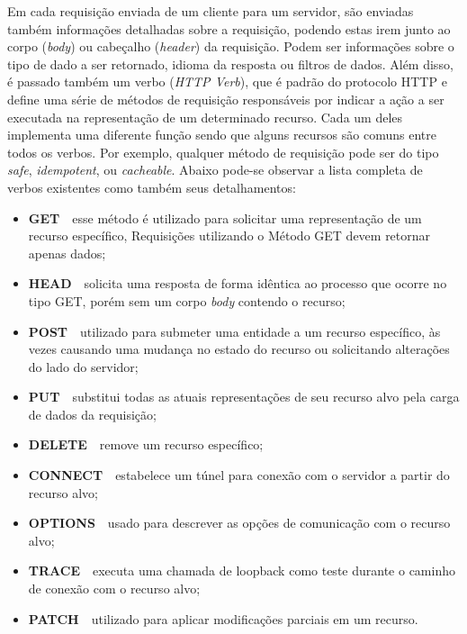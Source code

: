 Em cada requisição enviada de um cliente para um servidor, são enviadas também informações detalhadas sobre a requisição, podendo estas irem junto ao corpo (\textit{body}) ou cabeçalho (\textit{header}) da requisição. Podem ser informações sobre o tipo de dado a ser retornado, idioma da resposta ou filtros de dados. Além disso, é passado também um verbo (\textit{HTTP Verb}), que é padrão do protocolo HTTP e define uma série de métodos de requisição responsáveis por indicar a ação a ser executada na representação de um determinado recurso. Cada um deles implementa uma diferente função sendo que alguns recursos são comuns entre todos os verbos. Por exemplo, qualquer método de requisição pode ser do tipo  \textit{safe}, \textit{idempotent}, ou \textit{cacheable}. Abaixo pode-se observar a lista completa de verbos existentes como também seus detalhamentos:
\begin{itemize}
    \item \textbf{GET}~\textemdash~esse método é utilizado para solicitar uma representação de um recurso específico, Requisições utilizando o Método GET devem retornar apenas dados;
    \item \textbf{HEAD}~\textemdash~solicita uma resposta de forma idêntica ao processo que ocorre no tipo GET, porém sem um corpo \textit{body} contendo o recurso;
    \item \textbf{POST}~\textemdash~utilizado para submeter uma entidade a um recurso específico, às vezes causando uma mudança no estado do recurso ou solicitando alterações do lado do servidor;
    \item \textbf{PUT}~\textemdash~substitui todas as atuais representações de seu recurso alvo pela carga de dados da requisição;
    \item \textbf{DELETE}~\textemdash~remove um recurso específico;
    \item \textbf{CONNECT}~\textemdash~estabelece um túnel para conexão com o servidor a partir do recurso alvo;
    \item \textbf{OPTIONS}~\textemdash~usado para descrever as opções de comunicação com o recurso alvo;
    \item \textbf{TRACE}~\textemdash~executa uma chamada de loopback como teste durante o caminho de conexão com o recurso alvo;
    \item \textbf{PATCH}~\textemdash~utilizado para aplicar modificações parciais em um recurso.
\end{itemize}

